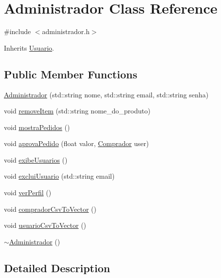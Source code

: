 \hypertarget{class_administrador}{}\section{Administrador Class Reference}
\label{class_administrador}


{\ttfamily \#include $<$administrador.\+h$>$}



Inherits \hyperlink{class_usuario}{Usuario}.

\subsection*{Public Member Functions}
\begin{DoxyCompactItemize}
\item 
\hyperlink{class_administrador_a493c6aa5f70e459339fd7f05c12237b0}{Administrador} (std\+::string nome, std\+::string email, std\+::string senha)
\item 
void \hyperlink{class_administrador_ac3032625947549cda5dd58fa7a8a1544}{remove\+Item} (std\+::string nome\+\_\+do\+\_\+produto)
\item 
void \hyperlink{class_administrador_ac3d67279a170b9d7a56c1a8e8d6d8220}{mostra\+Pedidos} ()
\item 
void \hyperlink{class_administrador_a05604fe263be531162e5e98f57d5d5c2}{aprova\+Pedido} (float valor, \hyperlink{class_comprador}{Comprador} user)
\item 
void \hyperlink{class_administrador_a4a4268e74646886bc8f87ef246bbaab1}{exibe\+Usuarios} ()
\item 
void \hyperlink{class_administrador_a066e1af058776437c43a98dabb44f02b}{exclui\+Usuario} (std\+::string email)
\item 
void \hyperlink{class_administrador_ad44fa015e8adccab79067f47e0f679b6}{ver\+Perfil} ()
\item 
void \hyperlink{class_administrador_a3ce381104bd6cf900b912519cae71d44}{comprador\+Csv\+To\+Vector} ()
\item 
void \hyperlink{class_administrador_a1c98197c9a5aaa38a4ec7bb37d19f8b6}{usuario\+Csv\+To\+Vector} ()
\item 
\hyperlink{class_administrador_a0e044ad3a41da3a0ff2c1ec7ef8fa800}{$\sim$\+Administrador} ()
\end{DoxyCompactItemize}


\subsection{Detailed Description}


